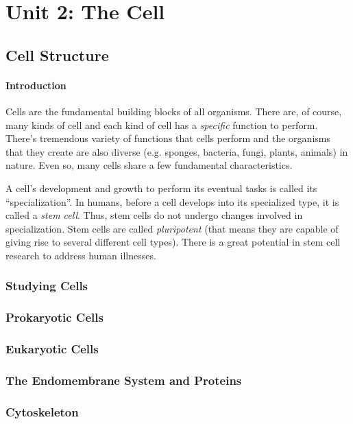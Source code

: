 \section{Unit 2: The Cell}
\subsection{Cell Structure}
\paragraph{Introduction}
Cells are the fundamental building blocks of all organisms. There are, of course, many kinds of cell and each kind of cell has a \emph{specific} function to perform. There's tremendous variety of functions that cells perform and the organisms that they create are also diverse (e.g. sponges, bacteria, fungi, plants, animals) in nature. Even so, many cells share a few fundamental characteristics.

A cell's development and growth to perform its eventual tasks is called its ``specialization''. In humans, before a cell develops into its specialized type, it is called a \emph{stem cell}. Thus, stem cells do not undergo changes involved in specialization. Stem cells are called \emph{pluripotent} (that means they are capable of giving rise to several different cell types). There is a great potential in stem cell research to address human illnesses.
\subsubsection{Studying Cells}
\subsubsection{Prokaryotic Cells}
\subsubsection{Eukaryotic Cells}
\subsubsection{The Endomembrane System and Proteins}
\subsubsection{Cytoskeleton}
